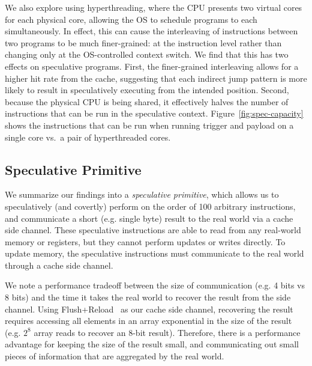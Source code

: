 We also explore using hyperthreading, where the CPU presents two virtual cores
for each physical core, allowing the OS to schedule programs to each
simultaneously. In effect, this can cause the interleaving of instructions
between two programs to be much finer-grained: at the instruction level rather
than changing only at the OS-controlled context switch. We find that this
has two effects on speculative programs. First, the finer-grained interleaving
allows for a higher hit rate from the cache, suggesting that each indirect jump
pattern is more likely to result in speculatively executing from the intended
position. %
Second, because the physical CPU is being shared, it effectively halves the
number of instructions that can be run in the speculative context.
Figure~\ref{fig:spec-capacity} shows the instructions that can be run when
running trigger and payload on a single core vs.\ a pair of hyperthreaded cores.

\subsection{Speculative Primitive}

We summarize our findings into a \emph{speculative primitive}, which allows us to
speculatively (and covertly) perform on the order of 100 arbitrary
instructions, and communicate a short (e.g. single byte) result to the real
world via a cache side channel. These speculative instructions are able to read
from any real-world memory or registers, but they cannot perform updates or
writes directly. To update memory, the speculative instructions must communicate
to the real world through a cache side channel.

We note a performance tradeoff between the size of communication (e.g. 4 bits vs 8
bits) and the time it takes the real world to recover the result from the side
channel. Using Flush+Reload~\cite{yarom2014flush+} as our cache side channel,
recovering the result requires accessing all elements in an array exponential in
the size of the result (e.g. $2^8$ array reads to recover an 8-bit result). 
Therefore, there is a
performance advantage for keeping the size of the result small, and communicating
out small pieces of information that are aggregated by the real world.


